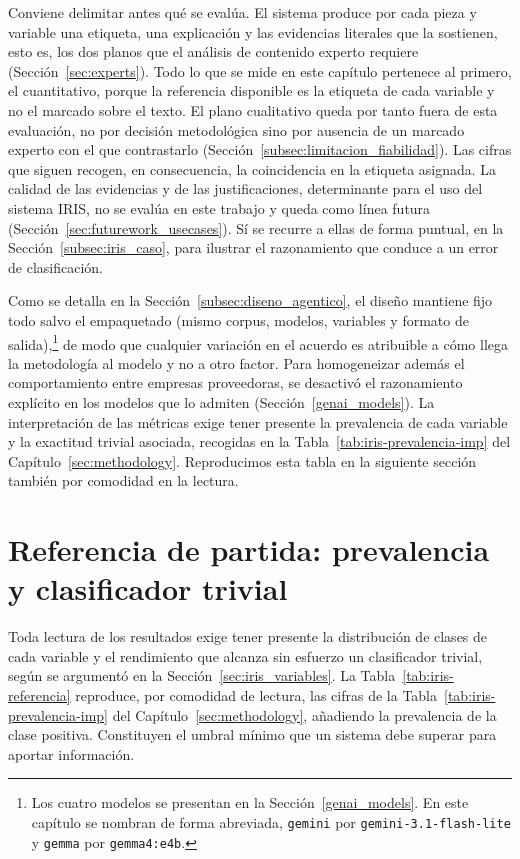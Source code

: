 Conviene delimitar antes qué se evalúa. El sistema produce por cada pieza y
variable una etiqueta, una explicación y las evidencias literales que la sostienen,
esto es, los dos planos que el análisis de contenido experto requiere
(Sección~\ref{sec:experts}). Todo lo que se mide en este capítulo pertenece al
primero, el cuantitativo, porque la referencia disponible es la etiqueta de cada
variable y no el marcado sobre el texto. El plano cualitativo queda por tanto fuera de esta evaluación,
no por decisión metodológica sino por ausencia de un marcado experto con el que
contrastarlo (Sección~\ref{subsec:limitacion_fiabilidad}). Las cifras que siguen recogen, en consecuencia,
la coincidencia en la etiqueta asignada. La calidad de las evidencias y de las
justificaciones, determinante para el uso del sistema IRIS, no se evalúa en
este trabajo y queda como línea futura
(Sección~\ref{sec:futurework_usecases}). Sí se recurre a ellas de forma
puntual, en la Sección~\ref{subsec:iris_caso}, para ilustrar el razonamiento que
conduce a un error de clasificación.

Como se detalla en la Sección~\ref{subsec:diseno_agentico}, el diseño mantiene fijo
todo salvo el empaquetado (mismo corpus, modelos, variables y formato de
salida),\footnote{Los cuatro modelos se presentan en la
Sección~\ref{genai_models}. En este capítulo se nombran de forma abreviada,
\texttt{gemini} por \texttt{gemini-3.1-flash-lite} y \texttt{gemma} por
\texttt{gemma4:e4b}.}
de modo que cualquier variación en el acuerdo es atribuible a cómo llega la
metodología al modelo y no a otro factor. Para homogeneizar además el comportamiento
entre empresas proveedoras, se desactivó el razonamiento explícito en los modelos que lo
admiten (Sección~\ref{genai_models}). La
interpretación de las métricas exige tener presente la prevalencia de cada variable
y la exactitud trivial asociada, recogidas en la
Tabla~\ref{tab:iris-prevalencia-imp} del Capítulo~\ref{sec:methodology}. Reproducimos esta tabla en la siguiente sección también por comodidad en la lectura.

\section{Referencia de partida: prevalencia y clasificador trivial}
\label{subsec:iris_referencia}

Toda lectura de los resultados exige tener presente la distribución de clases de
cada variable y el rendimiento que alcanza sin esfuerzo un clasificador trivial,
según se argumentó en la Sección~\ref{sec:iris_variables}. La
Tabla~\ref{tab:iris-referencia} reproduce, por comodidad de lectura, las cifras de
la Tabla~\ref{tab:iris-prevalencia-imp} del Capítulo~\ref{sec:methodology},
añadiendo la prevalencia de la clase positiva. Constituyen el umbral mínimo que un
sistema debe superar para aportar información.

